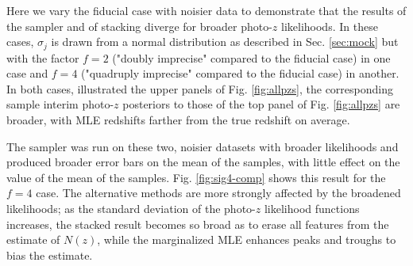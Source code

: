 \documentclass[preprint]{aastex}
\begin{document}
Here we vary the fiducial case with noisier data to demonstrate that the 
results of the sampler and of stacking diverge for broader photo-$z$ 
likelihoods.  In these cases, $\sigma_{j}$ is drawn from a normal distribution 
as described in Sec. \ref{sec:mock} but with the factor $f=2$ ("doubly 
imprecise" compared to the fiducial case) in one case and $f=4$ ("quadruply 
imprecise" compared to the fiducial case) in another.  In both cases, 
illustrated the upper panels of Fig. \ref{fig:allpzs}, the corresponding sample 
interim photo-$z$ posteriors to those of the top panel of Fig. \ref{fig:allpzs} 
are broader, with MLE redshifts farther from the true redshift on average.

The sampler was run on these two, noisier datasets with broader likelihoods and 
produced broader error bars on the mean of the samples, with little effect on 
the value of the mean of the samples.  Fig. \ref{fig:sig4-comp} shows this 
result for the $f=4$ case.  The alternative methods are more strongly affected 
by the broadened likelihoods; as the standard deviation of the photo-$z$ 
likelihood functions increases, the stacked result becomes so broad as to erase 
all features from the estimate of $N(z)$, while the marginalized MLE enhances 
peaks and troughs to bias the estimate.

%
%
\end{document}
